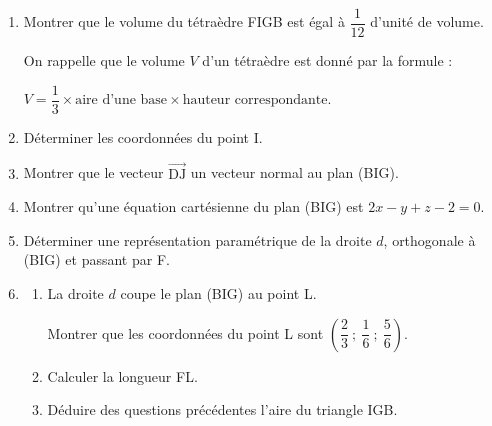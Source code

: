 \documentclass[10pt]{article}
\providecommand{\vect}[1]{\overrightarrow{#1}}
\begin{document}
\begin{enumerate}
\item Montrer que le volume du tétraèdre FIGB est égal à $\dfrac{1}{12}$ d'unité de volume. 

On rappelle que le volume $V$ d'un tétraèdre est donné par la formule :

\begin{center}$V = \dfrac13 \times \text{aire d'une base} \times  \text{hauteur correspondante}$.\end{center}
\item Déterminer les coordonnées du point I.
\item Montrer que le vecteur $\vect{\text{DJ}}$ un vecteur normal au plan (BIG).
\item Montrer qu'une équation cartésienne du plan (BIG) est $2x - y + z - 2 = 0$.
\item Déterminer une représentation paramétrique de la droite $d$, orthogonale à (BIG) et passant par F.
\item
	\begin{enumerate}
		\item La droite $d$ coupe le plan (BIG) au point L.
		
Montrer que les coordonnées du point L sont $\left(\dfrac23~;~\dfrac16~;~\dfrac56\right)$.
		\item Calculer la longueur FL.
		\item Déduire des questions précédentes l'aire du triangle IGB.
	\end{enumerate}
\end{enumerate}

\medskip
\end{document}
